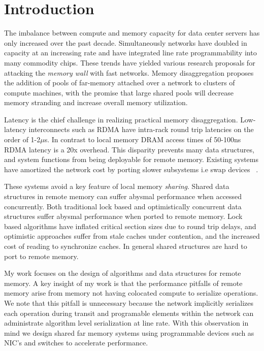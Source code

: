 
\section{Introduction}

The imbalance between compute and memory capacity for data
center servers has only increased over the past decade.
Simultaneously networks have doubled in capacity at an
increasing rate and have integrated line rate
programmability into many commodity chips. These trends have
yielded various research proposals for attacking the
\textit{memory wall} with fast networks. Memory
disaggregation proposes the addition of pools of far-memory
attached over a network to clusters of compute machines,
with the promise that large shared pools will decrease
memory stranding and increase overall memory utilization.

Latency is the chief challenge in realizing practical memory
disaggregation. Low-latency interconnects such as RDMA have
intra-rack round trip latencies on the order of 1-2$\mu$s.
In contrast to local memory DRAM access times of 50-100ns
RDMA latency is a 20x overhead. This disparity prevents many
data structures, and system functions from being deployable
for remote memory. Existing systems have amortized the
network cost by porting slower subsystems i.e swap devices
~\cite{fastswap, legoos}. 

These systems avoid a key feature of local memory
\textit{sharing}. Shared data structures in remote memory
can suffer abysmal performance when accessed concurrently.
Both traditional lock based and optimistically concurrent
data structures suffer abysmal performance when ported to
remote memory. Lock based algorithms have inflated critical
section sizes due to round trip delays, and optimistic
approaches suffer from stale caches under contention, and
the increased cost of reading to synchronize caches. In
general shared structures are hard to port to remote memory.

My work focuses on the design of algorithms and data
structures for remote memory.  A key insight of my work is
that the performance pitfalls of remote memory arise from
memory not having colocated compute to serialize operations.
We note that this pitfall is unnecessary because the network
implicitly serializes each operation during transit and
programable elements within the network can administrate
algorithm level serialization at line rate. With this
observation in mind we design shared far memory systems
using programmable devices such as NIC's and switches to
accelerate performance.

